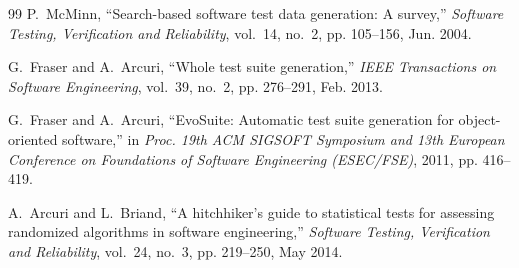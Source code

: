 \documentclass[12pt,onecolumn]{IEEEtran}
\begin{document}
\begin{thebibliography}{99}
P.~McMinn,
``Search-based software test data generation: A survey,''
\emph{Software Testing, Verification and Reliability},
vol.~14, no.~2, pp. 105--156, Jun. 2004.

G.~Fraser and A.~Arcuri,
``Whole test suite generation,''
\emph{IEEE Transactions on Software Engineering},
vol.~39, no.~2, pp. 276--291, Feb. 2013.

G.~Fraser and A.~Arcuri,
``EvoSuite: Automatic test suite generation for object-oriented
software,''
in \emph{Proc. 19th ACM SIGSOFT Symposium and 13th European
Conference on Foundations of Software Engineering (ESEC/FSE)}, 2011,
pp. 416--419.

A.~Arcuri and L.~Briand,
``A hitchhiker's guide to statistical tests for assessing randomized
algorithms in software engineering,''
\emph{Software Testing, Verification and Reliability},
vol.~24, no.~3, pp. 219--250, May 2014.

\end{thebibliography}
\end{document}
